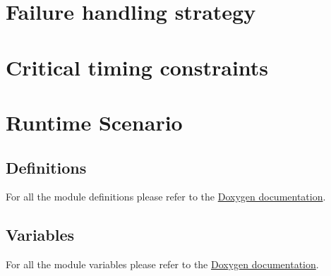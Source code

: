 
\section{Failure handling strategy}
\section{Critical timing constraints}
\section{Runtime Scenario}
\subsection{Definitions}
For all the module definitions please refer to the \href{doxygen/html/globals_defs.html}{Doxygen documentation}.
\subsection{Variables}
For all the module variables please refer to the \href{doxygen/html/globals_vars.html}{Doxygen documentation}.
